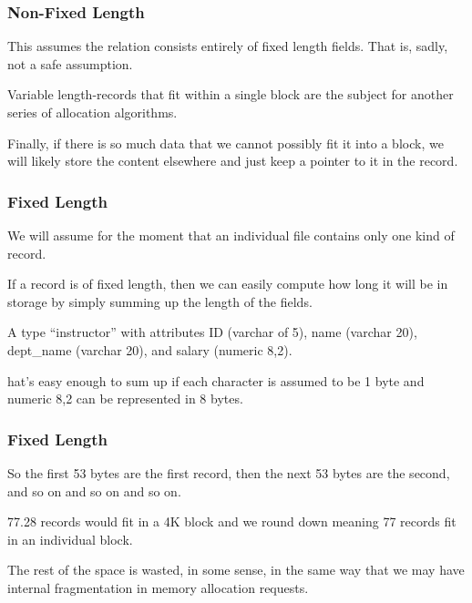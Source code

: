 \begin{frame}
\frametitle{Non-Fixed Length}

This assumes the relation consists entirely of fixed length fields. That is, sadly, not a safe assumption.

Variable length-records that fit within a single block are the subject for another series of allocation algorithms. 

Finally, if there is so much data that we cannot possibly fit it into a block, we will likely store the content elsewhere and just keep a pointer to it in the record.


\end{frame}



\begin{frame}
\frametitle{Fixed Length}

We will assume for the moment that an individual file contains only one kind of record. 

If a record is of fixed length, then we can easily compute how long it will be in storage by simply summing up the length of the fields. 

A type ``instructor'' with attributes ID (varchar of 5), name (varchar 20), dept\_name (varchar 20), and salary (numeric 8,2).

hat's easy enough to sum up if each character is assumed to be 1 byte and numeric 8,2 can be represented in 8 bytes.

\end{frame}



\begin{frame}
\frametitle{Fixed Length}
So the first 53 bytes are the first record, then the next 53 bytes are the second, and so on and so on and so on. 

77.28 records would fit in a 4K block and we round down meaning 77 records fit in an individual block. 

The rest of the space is wasted, in some sense, in the same way that we may have internal fragmentation in memory allocation requests.

\end{frame}



